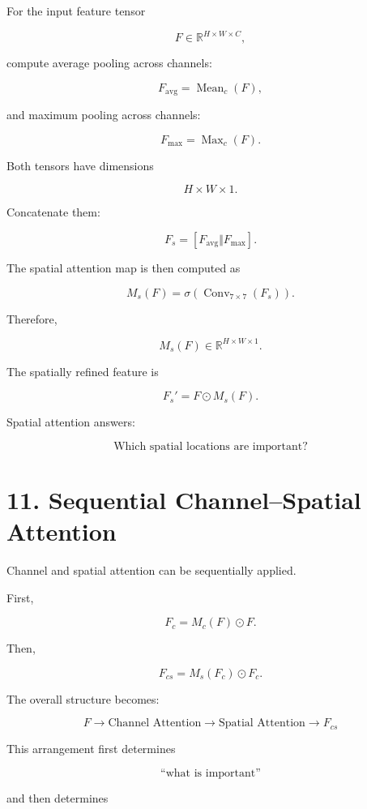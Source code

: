 \documentclass[10pt]{article}
\begin{document}
For the input feature tensor

\[
F\in\mathbb{R}^{H\times W\times C},
\]

compute average pooling across channels:

\[
F_{\mathrm{avg}}
=
\operatorname{Mean}_{c}(F),
\]

and maximum pooling across channels:

\[
F_{\mathrm{max}}
=
\operatorname{Max}_{c}(F).
\]

Both tensors have dimensions

\[
H\times W\times1.
\]

Concatenate them:

\[
F_s
=
[
F_{\mathrm{avg}}
\Vert
F_{\mathrm{max}}
].
\]

The spatial attention map is then computed as

\[
M_s(F)
=
\sigma
\left(
\operatorname{Conv}_{7\times7}(F_s)
\right).
\]

Therefore,

\[
M_s(F)
\in
\mathbb{R}^{H\times W\times1}.
\]

The spatially refined feature is

\[
F_s'
=
F\odot M_s(F).
\]

Spatial attention answers:

\[
\boxed{\text{Which spatial locations are important?}}
\]

\section*{11. Sequential Channel--Spatial Attention}

Channel and spatial attention can be sequentially applied.

First,

\[
F_c
=
M_c(F)\odot F.
\]

Then,

\[
F_{cs}
=
M_s(F_c)\odot F_c.
\]

The overall structure becomes:

\[
\boxed{
F
\rightarrow
\text{Channel Attention}
\rightarrow
\text{Spatial Attention}
\rightarrow
F_{cs}
}
\]

This arrangement first determines

\[
\text{``what is important''}
\]

and then determines
\end{document}
